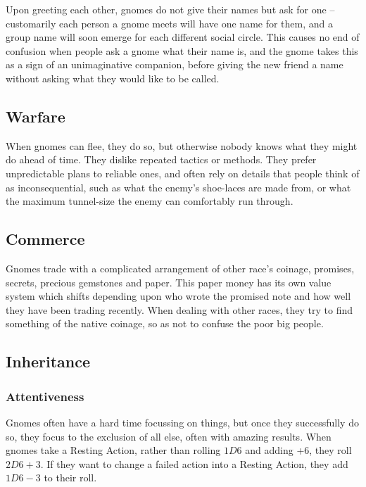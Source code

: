\begin{multicols}{2}
Upon greeting each other, gnomes do not give their names but ask for one -- customarily each person a gnome meets will have one name for them, and a group name will soon emerge for each different social circle. This causes no end of confusion when people ask a gnome what their name is, and the gnome takes this as a sign of an unimaginative companion, before giving the new friend a name without asking what they would like to be called.

\subsection{Warfare}

When gnomes can flee, they do so, but otherwise nobody knows what they might do ahead of time.
They dislike repeated tactics or methods.
They prefer unpredictable plans to reliable ones, and often rely on details that people think of as inconsequential, such as what the enemy's shoe-laces are made from, or what the maximum tunnel-size the enemy can comfortably run through.

\subsection{Commerce}

Gnomes trade with a complicated arrangement of other race's coinage, promises, secrets, precious gemstones and paper. This paper money has its own value system which shifts depending upon who wrote the promised note and how well they have been trading recently. When dealing with other races, they try to find something of the native coinage, so as not to confuse the poor big people.

\subsection{Inheritance}

\subsubsection[Attentiveness: roll 2D6+3 for resting actions]{Attentiveness}
\label{gnomishInheritance}

Gnomes often have a hard time focussing on things, but once they successfully do so, they focus to the exclusion of all else, often with amazing results.
When gnomes take a Resting Action, rather than rolling $1D6$ and adding +6, they roll $2D6+3$.
If they want to change a failed action into a Resting Action, they add $1D6-3$ to their roll.


\end{multicols}
